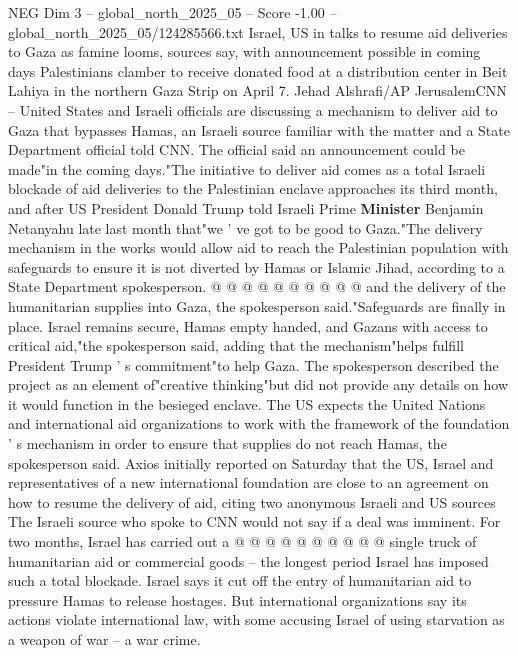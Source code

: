 \begin{textsample}{NEG Dim 3 – global\_north\_2025\_05 – Score -1.00 – global\_north\_2025\_05/124285566.txt}  \label{ex:f3_neg_315}
Israel, US in talks to resume aid deliveries to Gaza as famine looms, sources say, with announcement possible in coming days Palestinians clamber to receive donated food at a distribution center in Beit Lahiya in the northern Gaza Strip on April 7.
Jehad Alshrafi/AP JerusalemCNN -- United States and Israeli officials are discussing a mechanism to deliver aid to Gaza that bypasses Hamas, an Israeli source familiar with the matter and a State Department official told CNN.
The official said an announcement could be made"in the coming days."The initiative to deliver aid comes as a total Israeli blockade of aid deliveries to the Palestinian enclave approaches its third month, and after US President Donald Trump told Israeli Prime \textbf{Minister} Benjamin Netanyahu late last month that"we ' ve got to be good to Gaza."The delivery mechanism in the works would allow aid to reach the Palestinian population with safeguards to ensure it is not diverted by Hamas or Islamic Jihad, according to a State Department spokesperson. @ @ @ @ @ @ @ @ @ @ and the delivery of the humanitarian supplies into Gaza, the spokesperson said."Safeguards are finally in place.
Israel remains secure, Hamas empty handed, and Gazans with access to critical aid,"the spokesperson said, adding that the mechanism"helps fulfill President Trump ' s commitment"to help Gaza.
The spokesperson described the project as an element of"creative thinking"but did not provide any details on how it would function in the besieged enclave.
The US expects the United Nations and international aid organizations to work with the framework of the foundation ' s mechanism in order to ensure that supplies do not reach Hamas, the spokesperson said.
Axios initially reported on Saturday that the US, Israel and representatives of a new international foundation are close to an agreement on how to resume the delivery of aid, citing two anonymous Israeli and US sources The Israeli source who spoke to CNN would not say if a deal was imminent.
For two months, Israel has carried out a @ @ @ @ @ @ @ @ @ @ single truck of humanitarian aid or commercial goods -- the longest period Israel has imposed such a total blockade.
Israel says it cut off the entry of humanitarian aid to pressure Hamas to release hostages.
But international organizations say its actions violate international law, with some accusing Israel of using starvation as a weapon of war -- a war crime.

\end{textsample}
